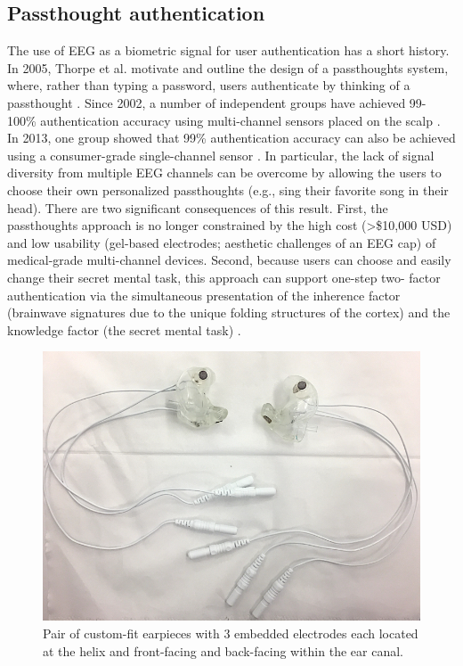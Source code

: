 \documentclass[letterpaper,twocolumn,10pt]{article}
\begin{document}
\subsection{Passthought authentication}
The use of EEG as a biometric signal for user authentication has a short history.
In 2005, Thorpe et al. motivate and outline the design of a passthoughts system,
where, rather than typing a password, users authenticate 
by thinking of a passthought \cite{Thorpe2005}.
Since 2002, a number of independent groups have achieved 99-
100\% authentication accuracy using multi-channel sensors placed on the scalp \cite{Poulos2002,Marcel2007a,Palaniappan2008,Ashby2011}.
In 2013, one group showed that 99\% authentication accuracy can also be
achieved using a consumer-grade single-channel sensor \cite{Chuang2013b}. In particular, the
lack of signal diversity from multiple EEG channels can be overcome by allowing
the users to choose their own personalized passthoughts (e.g., sing their favorite
song in their head). There are two significant consequences of this result. First,
the passthoughts approach is no longer constrained by the high cost (\textgreater \$10,000 USD)
and low usability (gel-based electrodes; aesthetic challenges of an EEG cap) of
medical-grade multi-channel devices. Second, because users can choose and
easily change their secret mental task, this approach can support one-step two-
factor authentication via the simultaneous presentation of the inherence factor
(brainwave signatures due to the unique folding structures of the cortex) and the
knowledge factor (the secret mental task) \cite{Chuang2014}.

\begin{figure}[htbp]
\centering
\includegraphics[width=.9\linewidth]{./figures/2EEEG.jpg}
\caption{Pair of custom-fit earpieces with 3 embedded electrodes each located at the helix and front-facing and back-facing within the ear canal.}
\end{figure}
\end{document}
